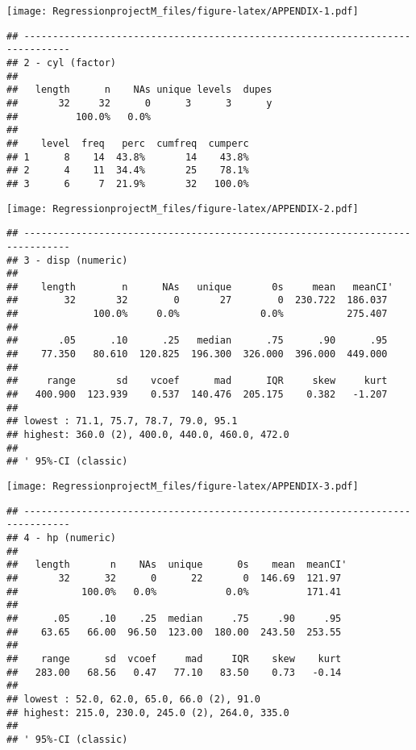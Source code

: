 \documentclass[
]{article}
\begin{document}
\texttt{[image: RegressionprojectM\_files/figure-latex/APPENDIX-1.pdf]}

\begin{verbatim}
## ------------------------------------------------------------------------------ 
## 2 - cyl (factor)
## 
##   length      n    NAs unique levels  dupes
##       32     32      0      3      3      y
##          100.0%   0.0%                     
## 
##    level  freq   perc  cumfreq  cumperc
## 1      8    14  43.8%       14    43.8%
## 2      4    11  34.4%       25    78.1%
## 3      6     7  21.9%       32   100.0%
\end{verbatim}

\texttt{[image: RegressionprojectM\_files/figure-latex/APPENDIX-2.pdf]}

\begin{verbatim}
## ------------------------------------------------------------------------------ 
## 3 - disp (numeric)
## 
##    length        n      NAs   unique       0s     mean   meanCI'
##        32       32        0       27        0  230.722  186.037
##             100.0%     0.0%              0.0%           275.407
##                                                                
##       .05      .10      .25   median      .75      .90      .95
##    77.350   80.610  120.825  196.300  326.000  396.000  449.000
##                                                                
##     range       sd    vcoef      mad      IQR     skew     kurt
##   400.900  123.939    0.537  140.476  205.175    0.382   -1.207
##                                                                
## lowest : 71.1, 75.7, 78.7, 79.0, 95.1
## highest: 360.0 (2), 400.0, 440.0, 460.0, 472.0
## 
## ' 95%-CI (classic)
\end{verbatim}

\texttt{[image: RegressionprojectM\_files/figure-latex/APPENDIX-3.pdf]}

\begin{verbatim}
## ------------------------------------------------------------------------------ 
## 4 - hp (numeric)
## 
##   length       n    NAs  unique      0s    mean  meanCI'
##       32      32      0      22       0  146.69  121.97
##           100.0%   0.0%            0.0%          171.41
##                                                        
##      .05     .10    .25  median     .75     .90     .95
##    63.65   66.00  96.50  123.00  180.00  243.50  253.55
##                                                        
##    range      sd  vcoef     mad     IQR    skew    kurt
##   283.00   68.56   0.47   77.10   83.50    0.73   -0.14
##                                                        
## lowest : 52.0, 62.0, 65.0, 66.0 (2), 91.0
## highest: 215.0, 230.0, 245.0 (2), 264.0, 335.0
## 
## ' 95%-CI (classic)
\end{verbatim}
\end{document}
